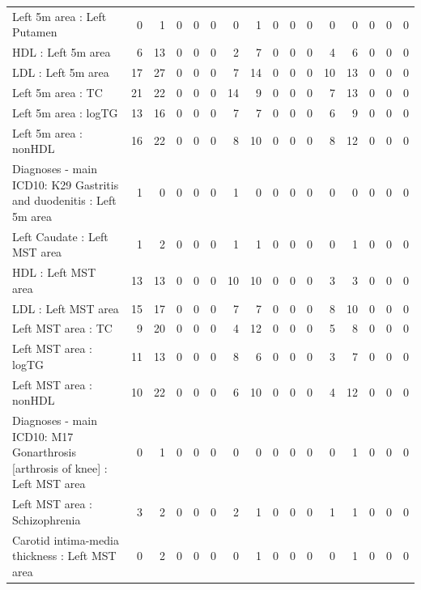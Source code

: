 \begin{table}[ht]
\begin{tabular}{lrrrrrrrrrrrrrrr}
  Left 5m area : Left Putamen &   0 &   1 &   0 &   0 &   0 &   0 &   1 &   0 &   0 &   0 &   0 &   0 &   0 &   0 &   0 \\ 
  HDL : Left 5m area &   6 &  13 &   0 &   0 &   0 &   2 &   7 &   0 &   0 &   0 &   4 &   6 &   0 &   0 &   0 \\ 
  LDL : Left 5m area &  17 &  27 &   0 &   0 &   0 &   7 &  14 &   0 &   0 &   0 &  10 &  13 &   0 &   0 &   0 \\ 
  Left 5m area : TC &  21 &  22 &   0 &   0 &   0 &  14 &   9 &   0 &   0 &   0 &   7 &  13 &   0 &   0 &   0 \\ 
  Left 5m area : logTG &  13 &  16 &   0 &   0 &   0 &   7 &   7 &   0 &   0 &   0 &   6 &   9 &   0 &   0 &   0 \\ 
  Left 5m area : nonHDL &  16 &  22 &   0 &   0 &   0 &   8 &  10 &   0 &   0 &   0 &   8 &  12 &   0 &   0 &   0 \\ 
  Diagnoses - main ICD10: K29 Gastritis and duodenitis : Left 5m area &   1 &   0 &   0 &   0 &   0 &   1 &   0 &   0 &   0 &   0 &   0 &   0 &   0 &   0 &   0 \\ 
  Left Caudate : Left MST area &   1 &   2 &   0 &   0 &   0 &   1 &   1 &   0 &   0 &   0 &   0 &   1 &   0 &   0 &   0 \\ 
  HDL : Left MST area &  13 &  13 &   0 &   0 &   0 &  10 &  10 &   0 &   0 &   0 &   3 &   3 &   0 &   0 &   0 \\ 
  LDL : Left MST area &  15 &  17 &   0 &   0 &   0 &   7 &   7 &   0 &   0 &   0 &   8 &  10 &   0 &   0 &   0 \\ 
  Left MST area : TC &   9 &  20 &   0 &   0 &   0 &   4 &  12 &   0 &   0 &   0 &   5 &   8 &   0 &   0 &   0 \\ 
  Left MST area : logTG &  11 &  13 &   0 &   0 &   0 &   8 &   6 &   0 &   0 &   0 &   3 &   7 &   0 &   0 &   0 \\ 
  Left MST area : nonHDL &  10 &  22 &   0 &   0 &   0 &   6 &  10 &   0 &   0 &   0 &   4 &  12 &   0 &   0 &   0 \\ 
  Diagnoses - main ICD10: M17 Gonarthrosis [arthrosis of knee] : Left MST area &   0 &   1 &   0 &   0 &   0 &   0 &   0 &   0 &   0 &   0 &   0 &   1 &   0 &   0 &   0 \\ 
  Left MST area : Schizophrenia &   3 &   2 &   0 &   0 &   0 &   2 &   1 &   0 &   0 &   0 &   1 &   1 &   0 &   0 &   0 \\ 
  Carotid intima-media thickness : Left MST area &   0 &   2 &   0 &   0 &   0 &   0 &   1 &   0 &   0 &   0 &   0 &   1 &   0 &   0 &   0 \\ 

\end{tabular}
\end{table}
